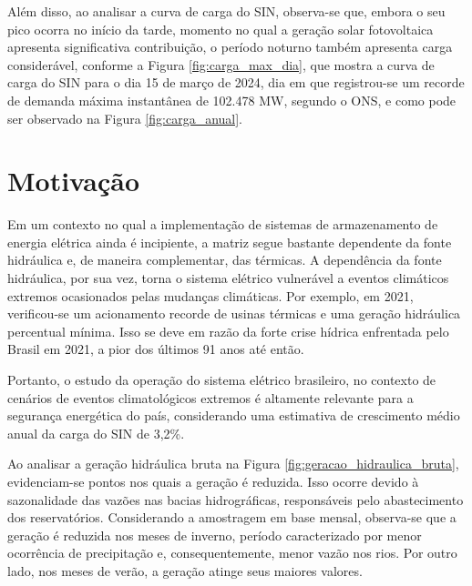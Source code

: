 Além disso, ao analisar a curva de carga do SIN, observa-se que, embora o seu pico ocorra no início da 
tarde, momento no qual a geração solar fotovoltaica apresenta significativa contribuição, o período noturno também 
apresenta carga considerável, conforme a Figura \ref{fig:carga_max_dia}, que mostra a curva de carga do SIN para o 
dia 15 de março de 2024, dia em que registrou-se um recorde de demanda máxima instantânea de 102.478 MW, segundo o ONS, 
e como pode ser observado na Figura \ref{fig:carga_anual}.

\begin{figure}[!ht]
	{}
	{}
\end{figure}

\section{Motivação}
Em um contexto no qual a implementação de sistemas de armazenamento de energia elétrica ainda é incipiente,
a matriz segue bastante dependente da fonte hidráulica e, de maneira complementar, das térmicas. A dependência da fonte
hidráulica, por sua vez, torna o sistema elétrico vulnerável a eventos climáticos extremos ocasionados pelas mudanças
climáticas. Por exemplo, em 2021, verificou-se um acionamento recorde de usinas térmicas e uma geração hidráulica 
percentual mínima. Isso se deve em razão da forte crise hídrica enfrentada pelo Brasil em 2021, a pior dos últimos 91 anos
até então. \cite{Soares2023}

\begin{figure}[!ht]
	{}
	{}
\end{figure}

Portanto, o estudo da operação do sistema elétrico brasileiro, no contexto de cenários de eventos
climatológicos extremos é altamente relevante para a segurança energética do país, considerando uma estimativa de 
crescimento médio anual da carga do SIN de 3,2\%. \cite{pen2024}

Ao analisar a geração hidráulica bruta na Figura \ref{fig:geracao_hidraulica_bruta}, evidenciam-se pontos nos 
quais a geração é reduzida. Isso ocorre devido à sazonalidade das vazões nas bacias hidrográficas, responsáveis pelo 
abastecimento dos reservatórios. Considerando a amostragem em base mensal, observa-se que a geração é reduzida nos meses
de inverno, período caracterizado por menor ocorrência de precipitação e, consequentemente, menor vazão nos rios. Por
outro lado, nos meses de verão, a geração atinge seus maiores valores.

